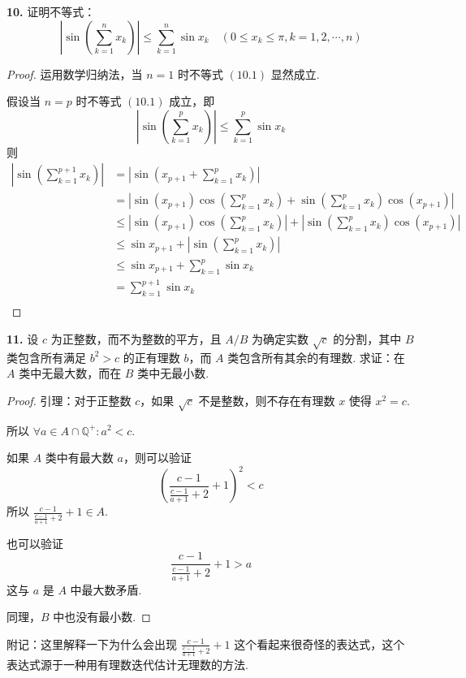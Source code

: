 \textbf{10.} 证明不等式：
\[\left\vert \sin \left(\sum_{k=1}^{n}x_k\right)\right\vert \leqslant \sum_{k=1}^{n} \sin x_k \quad (0 \leqslant x_k \leqslant \pi, k = 1,2,\cdots,n) \tag{10.1}\]
\begin{proof}
    运用数学归纳法，当 $n=1$ 时不等式 $(10.1)$ 显然成立.

    假设当 $n = p$ 时不等式 $(10.1)$ 成立，即
    \[\left\vert \sin \left(\sum_{k=1}^{p}x_k\right)\right\vert \leqslant \sum_{k=1}^{p} \sin x_k \tag{10.2}\]
    则
    \begin{align*}
        \left\vert \sin \left(\sum_{k=1}^{p+1}x_k\right)\right\vert &= \left\vert \sin\left(x_{p+1} + \sum_{k=1}^{p}x_k\right)\right\vert\\
        &=\left\vert \sin (x_{p+1}) \cos \left(\sum_{k=1}^{p}x_k\right) + \sin \left(\sum_{k=1}^{p}x_k\right) \cos (x_{p+1})\right\vert\\
        &\leqslant \left\vert\sin (x_{p+1}) \cos \left(\sum_{k=1}^{p}x_k\right)\right\vert + \left\vert\sin \left(\sum_{k=1}^{p}x_k\right) \cos (x_{p+1})\right\vert\\
        &\leqslant \sin x_{p+1} + \left\vert \sin \left(\sum_{k=1}^{p}x_k\right)\right\vert\\
        &\leqslant \sin x_{p+1} + \sum_{k=1}^{p} \sin x_k\\
        &= \sum_{k=1}^{p+1} \sin x_k\\
    \end{align*}
\end{proof}
\vspace{9pt}

\textbf{11.} 设 $c$ 为正整数，而不为整数的平方，且 $A/B$ 为确定实数 $\sqrt{c}$ 的分割，其中 $B$ 类包含所有满足 $b^2 > c$ 的正有理数 $b$，而 $A$ 类包含所有其余的有理数. 求证：在 $A$ 类中无最大数，而在 $B$ 类中无最小数.
\begin{proof}
    引理：对于正整数 $c$，如果 $\sqrt{c}$ 不是整数，则不存在有理数 $x$ 使得 $x^2 = c$.

    所以 $\forall a \in A \cap \mathbb{Q}^+: a^2 < c$.

    如果 $A$ 类中有最大数 $a$，则可以验证
    \[\left(\frac{c-1}{\frac{c-1}{a+1}+2}+1\right)^2 < c\]
    所以 $\displaystyle \frac{c-1}{\frac{c-1}{a+1}+2}+1 \in A$.

    也可以验证
    \[\frac{c-1}{\frac{c-1}{a+1}+2}+1 > a\]
    这与 $a$ 是 $A$ 中最大数矛盾.

    同理，$B$ 中也没有最小数.
\end{proof}
附记：这里解释一下为什么会出现 $\displaystyle \frac{c-1}{\frac{c-1}{a+1}+2}+1$ 这个看起来很奇怪的表达式，这个表达式源于一种用有理数迭代估计无理数的方法.

